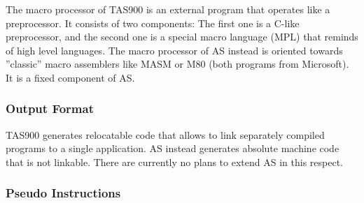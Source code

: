 \documentclass[12pt,twoside]{report}
\newcommand{\asname}{{AS}}
\begin{document}
The macro processor of TAS900 is an external program that operates
like a preprocessor.  It consists of two components: The first one is
a C-like preprocessor, and the second one is a special macro language
(MPL) that reminds of high level languages.  The macro processor of
\asname{} instead is oriented towards ''classic'' macro assemblers like MASM
or M80 (both programs from Microsoft).  It is a fixed component of
\asname{}.

\subsubsection{Output Format}

TAS900 generates relocatable code that allows to link separately
compiled programs to a single application.  \asname{} instead generates
absolute machine code that is not linkable.  There are currently no
plans to extend \asname{} in this respect.

\subsubsection{Pseudo Instructions}
\end{document}

